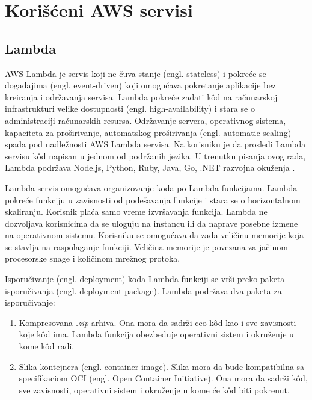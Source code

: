 \documentclass[12pt,oneside]{memoir}
\begin{document}
\section{Korišćeni AWS servisi}
\subsection{Lambda}
 
AWS Lambda je servis koji ne čuva stanje (engl. stateless) i pokreće se događajima (engl. event-driven) koji omogućava pokretanje aplikacije bez kreiranja i održavanja servisa. Lambda pokreće zadati kôd na računarskoj infrastrukturi velike dostupnosti (engl. high-availability) i stara se o administraciji računarskih resursa. Održavanje servera, operativnog sistema, kapaciteta za proširivanje, automatskog proširivanja (engl. automatic scaling) spada pod nadležnosti AWS Lambda servisa. Na korisniku je da prosledi Lambda servisu kôd napisan u jednom od podržanih jezika. U trenutku pisanja ovog rada, Lambda podržava Node.js, Python, Ruby, Java, Go, .NET razvojna okuženja \cite{lr}.
 
Lambda servis omogućava organizovanje koda po Lambda funkcijama. Lambda pokreće funkciju u zavisnosti od podešavanja funkcije i stara se o horizontalnom skaliranju. Korisnik plaća samo vreme izvršavanja funkcija. Lambda ne dozvoljava korisnicima da se uloguju na instancu ili da naprave posebne izmene na operativnom sistemu. Korisniku se omogućava da zada veličinu memorije koja se stavlja na raspolaganje funkciji. Veličina memorije je povezana za jačinom procesorske snage i količinom mrežnog protoka.
 
Isporučivanje (engl. deployment) koda Lambda funkciji se vrši preko paketa isporučivanja (engl. deployment package). Lambda podržava dva paketa za isporučivanje:
\begin{enumerate}
  \item Kompresovana \emph{.zip} arhiva. Ona mora da sadrži ceo kôd kao i sve zavisnosti koje kôd ima. Lambda funkcija obezbeđuje operativni sistem i okruženje u kome kôd radi.
  \item Slika kontejnera (engl. container image). Slika mora da bude kompatibilna sa specifikaciom OCI (engl. Open Container Initiative). Ona mora da sadrži kôd, sve zavisnosti, operativni sistem i okruženje u kome će kôd biti pokrenut.
\end{enumerate}
 
\end{document}
